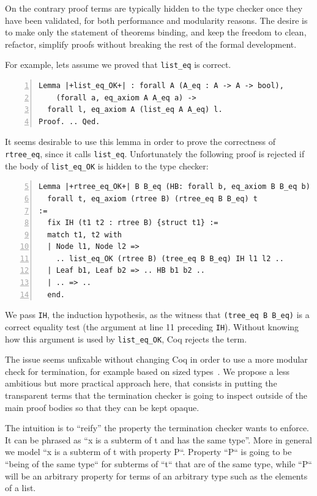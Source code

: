 \documentclass[sigplan,10pt,review]{acmart}\settopmatter{printfolios=true,printccs=false,printacmref=false}
\begin{document}
On the contrary proof terms are typically hidden to the type checker once
they have been validated, for both performance and modularity reasons.
The desire is to make only the statement of theorems binding, and keep
the freedom to clean, refactor, simplify proofs without breaking
the rest of the formal development. 

For example, lets assume we proved that \lstinline+list_eq+ is
correct.

\begin{minipage}{\textwidth}\begin{lstlisting}[numbers=left]
Lemma |+list_eq_OK+| : forall A (A_eq : A -> A -> bool),
    (forall a, eq_axiom A A_eq a) ->
  forall l, eq_axiom A (list_eq A A_eq) l.
Proof. .. Qed.
\end{lstlisting}\end{minipage}

\noindent
It seems desirable to use this lemma in order to prove the
correctness of \lstinline+rtree_eq+, since it calls
\lstinline+list_eq+.
Unfortunately the following proof is rejected if the body of
\lstinline+list_eq_OK+ is hidden to the type checker:

\begin{minipage}{\textwidth}\begin{lstlisting}[numbers=left,firstnumber=5]
Lemma |+rtree_eq_OK+| B B_eq (HB: forall b, eq_axiom B B_eq b) :
  forall t, eq_axiom (rtree B) (rtree_eq B B_eq) t
:= 
  fix IH (t1 t2 : rtree B) {struct t1} :=
  match t1, t2 with
  | Node l1, Node l2 =>
    .. list_eq_OK (rtree B) (tree_eq B B_eq) IH l1 l2 ..
  | Leaf b1, Leaf b2 => .. HB b1 b2 ..
  | .. => ..
  end.
\end{lstlisting}\end{minipage}

\noindent
We pass \lstinline+IH+, the induction hypothesis, as the
witness that \lstinline+(tree_eq B B_eq)+ is a correct equality test
(the argument at line 11 preceding \lstinline+IH+). 
Without knowing how this argument is used
by \lstinline+list_eq_OK+, Coq rejects the term.

The issue seems unfixable without changing Coq in order to use a more
modular check for termination, for example based on sized
types~\cite{sacchini:pastel-00622429}.
We propose a less ambitious but more practical approach here, that
consists in putting the transparent terms that the termination checker
is going to inspect outside of the main proof bodies so that they can be 
kept opaque.

The intuition is to ``reify'' the property the termination checker wants
to enforce. It can be phrased as ``x is a subterm of t and has the same
type''. More in general we model ``x is a subterm of t with property
P``. Property ``P`` is going to be ``being of the same type`` 
for subterms of ``t`` that are of the same type, while ``P`` 
will be an arbitrary property for terms of an arbitrary type such 
as the elements of a list.
\end{document}
